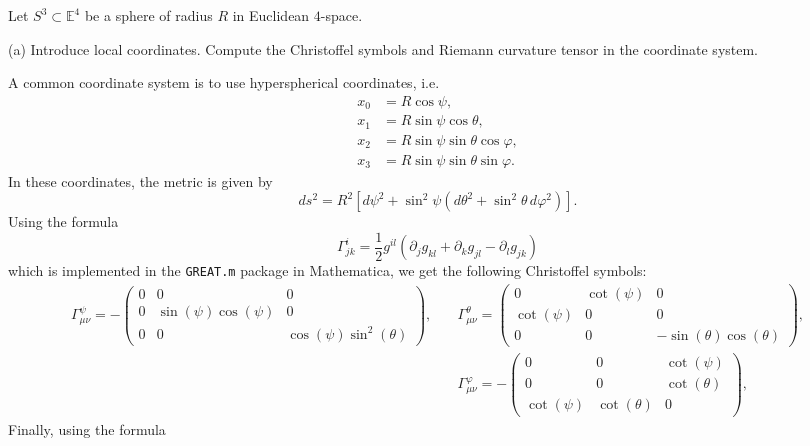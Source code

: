 \documentclass{../../templates/lkx_pset}
\begin{document}
\begin{problem}{7}
  Let $S^3 \subset \mathbb{E}^4$ be a sphere of radius $R$ in Euclidean $4$-space.
\end{problem}

\begin{parts}
  \begin{part}{(a)}
    Introduce local coordinates. Compute the Christoffel symbols and Riemann curvature tensor in the coordinate system.
  \end{part}

  A common coordinate system is to use hyperspherical coordinates, i.e.
  \[
    \begin{aligned}
      x_0 &= R\cos\psi,\\
      x_1 &= R\sin\psi\cos\theta,\\
      x_2 &= R\sin\psi\sin\theta\cos\varphi,\\ 
      x_3 &= R\sin\psi\sin\theta\sin\varphi.
    \end{aligned}
  \]
  In these coordinates, the metric is given by
  \[
    ds^2 = R^2\left[d\psi^2 + \sin^2\psi \left(d\theta^2 + \sin^2 \theta \,d\varphi^2\right)\right].
  \]
  Using the formula 
  \[\Gamma^i_{j k} =\frac{1}{2}g^{il}(\partial_j g_{kl} + \partial_k g_{j l} - \partial_l g_{j k})\]
  which is implemented in the \texttt{GREAT.m} package in Mathematica, we get the following Christoffel symbols:
  \[
    \begin{aligned}
    \Gamma^\psi_{\mu\nu} = -\begin{pmatrix}
      0 & 0 & 0 \\
      0 & \sin(\psi)\cos(\psi)&0\\
      0 & 0 & \cos(\psi)\sin^2(\theta)
    \end{pmatrix},\quad&
    \Gamma^\theta_{\mu\nu} = \begin{pmatrix}
      0 & \cot(\psi) & 0 \\
      \cot(\psi) & 0 & 0 \\
      0 & 0 & -\sin(\theta)\cos(\theta) 
    \end{pmatrix},\\
    &\Gamma^\varphi_{\mu\nu} = -\begin{pmatrix}
      0 & 0 & \cot(\psi)  \\
      0 & 0 & \cot(\theta)\\
      \cot(\psi) & \cot(\theta) & 0 
    \end{pmatrix},
    \end{aligned}
  \]
  Finally, using the formula 
  \[
\]
\end{parts}
\end{document}
